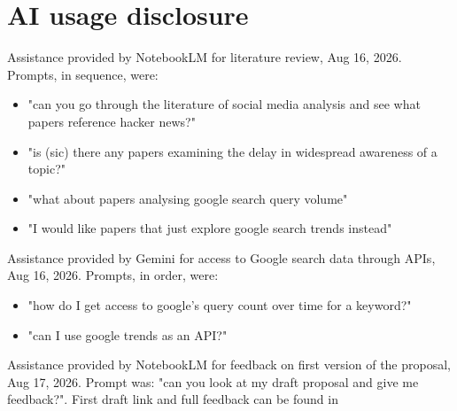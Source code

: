 \documentclass[nonacm,sigconf]{acmart}
\begin{document}



\appendix
\section{AI usage disclosure}
Assistance provided by NotebookLM for literature review, Aug 16, 2026. Prompts, in sequence, were:
\begin{itemize}
    \item "can you go through the literature of social media analysis and see what papers reference hacker news?"
    \item "is (sic) there any papers examining the delay in widespread awareness of a topic?"
    \item "what about papers analysing google search query volume"
    \item "I would like papers that just explore google search trends instead"
\end{itemize}

Assistance provided by Gemini for access to Google search data through APIs, Aug 16, 2026. Prompts, in order, were:
\begin{itemize}
    \item "how do I get access to google's query count over time for a keyword?"
    \item "can I use google trends as an API?"
\end{itemize}

Assistance provided by NotebookLM for feedback on first version of the proposal, Aug 17, 2026. Prompt was: "can you look at my draft proposal and give me feedback?". First draft link and full feedback can be found in \cite{projectnotes}
\end{document}
